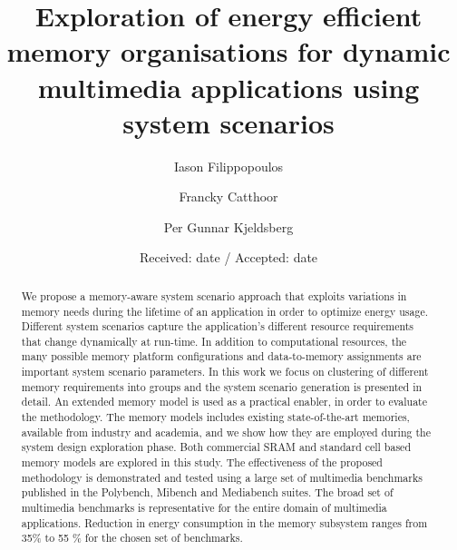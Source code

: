 \documentclass[smallcondensed]{svjour3}
\begin{document}
\title{Exploration of energy efficient memory organisations for dynamic multimedia applications using system scenarios}


\author{Iason Filippopoulos \and Francky Catthoor \and Per Gunnar Kjeldsberg}



\date{Received: date / Accepted: date}


\maketitle

\begin{abstract}
We propose a memory-aware system scenario approach that exploits variations in memory needs during the lifetime of an application in order to optimize energy usage. 
Different system scenarios capture the application's different resource requirements that change dynamically at run-time. 
In addition to computational resources, the many possible memory platform configurations and data-to-memory assignments are important system scenario parameters. 
In this work we focus on clustering of different memory requirements into groups and the system scenario generation is presented in detail.
An extended memory model is used as a practical enabler, in order to evaluate the methodology. 
The memory models includes existing state-of-the-art memories, available from industry and academia, and we show how they are employed during the system design exploration phase. 
Both commercial SRAM and standard cell based memory models are explored in this study. 
The effectiveness of the proposed methodology is demonstrated and tested using a large set of multimedia benchmarks published in the Polybench, Mibench and Mediabench suites.
The broad set of multimedia benchmarks is representative for the entire domain of multimedia applications.
Reduction in energy consumption in the memory subsystem ranges from 35\% to 55 \% for the chosen set of benchmarks.
\end{abstract}
\end{document}
